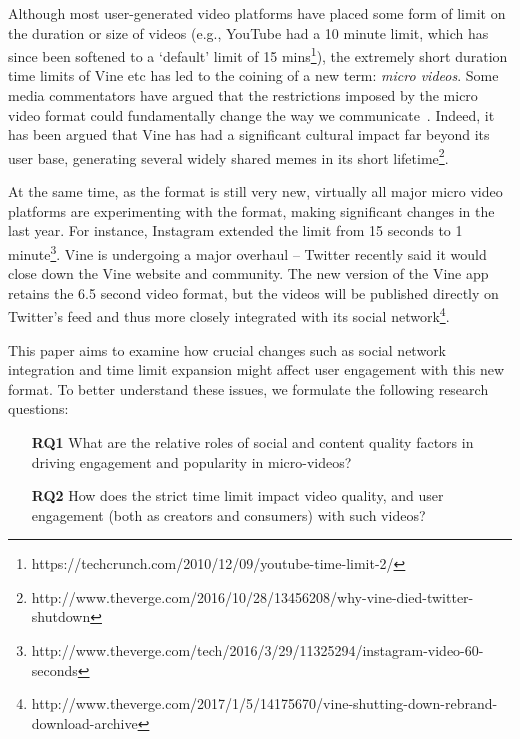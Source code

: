 Although most user-generated video platforms have placed some form of limit on the duration or size of videos (e.g., YouTube had a 10 minute limit, which has since been softened to a `default' limit of 15 mins\footnote{\scriptsize https://techcrunch.com/2010/12/09/youtube-time-limit-2/}), the extremely short duration time limits of Vine etc has led to the coining of a new term: \emph{micro videos}. Some media commentators have argued that the restrictions imposed by the micro video format could fundamentally change the way we communicate~\cite{bbc}. Indeed, it has been argued that Vine has had a significant cultural impact far beyond its user base, generating several widely shared memes in its short lifetime\footnote{\scriptsize http://www.theverge.com/2016/10/28/13456208/why-vine-died-twitter-shutdown}. 


At the same time, as the format is still very new, virtually all major micro video platforms are experimenting with the format, making significant changes in the last year. For instance, Instagram extended the limit from 15 seconds to 1 minute\footnote{\scriptsize http://www.theverge.com/tech/2016/3/29/11325294/instagram-video-60-seconds}. Vine is undergoing a major overhaul -- Twitter recently said it would close down the Vine website and community. The new version of the Vine app retains the 6.5 second video format, but the videos will be published directly on Twitter's feed and thus more closely integrated with its social network\footnote{\scriptsize http://www.theverge.com/2017/1/5/14175670/vine-shutting-down-rebrand-download-archive}. 

This paper aims to examine how  crucial changes such as social network integration and time limit expansion might affect user engagement with this new format. 
To better understand these issues, we formulate the following research questions: 

\begin{itemize}
    \item[\textbf{RQ1}] What are the relative roles of  social and content quality factors in driving engagement and popularity in micro-videos?
    \item[\textbf{RQ2}] How does the strict time limit impact video quality, and user engagement (both as creators and consumers) with such videos? %
\end{itemize}

